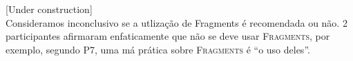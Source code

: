 
[Under construction] \\

Consideramos inconclusivo se a utliza\c{c}\~ao de Fragments \'e recomendada ou n\~ao. 2 participantes afirmaram enfaticamente que n\~ao se deve usar \textsc{Fragments}, por exemplo, segundo P7, uma m\'a pr\'atica sobre \textsc{Fragments} \'e ``o uso deles''.